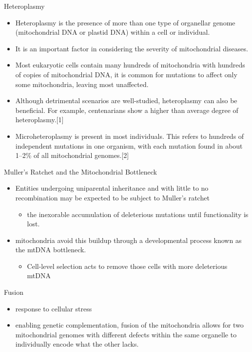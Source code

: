 \documentclass[presentation, smaller]{beamer}
\begin{document}
\begin{frame}[label={sec:org964335c}]{Heteroplasmy}
\begin{itemize}
\item Heteroplasmy is the presence of more than one type of organellar
genome (mitochondrial DNA or plastid DNA) within a cell or
individual.

\item It is an important factor in considering the severity of
mitochondrial diseases.

\item Most eukaryotic cells contain many hundreds of mitochondria with
hundreds of copies of mitochondrial DNA, it is common for mutations
to affect only some mitochondria, leaving most unaffected.

\item Although detrimental scenarios are well-studied, heteroplasmy can
also be beneficial. For example, centenarians show a higher than
average degree of heteroplasmy.[1]

\item Microheteroplasmy is present in most individuals. This refers to
hundreds of independent mutations in one organism, with each
mutation found in about 1–2\% of all mitochondrial genomes.[2]
\end{itemize}
\end{frame}

\begin{frame}[label={sec:org19cf295}]{Muller's Ratchet and the Mitochondrial Bottleneck}
\begin{itemize}
\item Entities undergoing uniparental inheritance and with little to no
recombination may be expected to be subject to Muller's ratchet
\begin{itemize}
\item the inexorable accumulation of deleterious mutations until functionality
is lost.
\end{itemize}
\item mitochondria avoid this buildup through a developmental process
known as the mtDNA bottleneck. 
\begin{itemize}
\item Cell-level selection acts to remove those cells with more deleterious mtDNA
\end{itemize}
\end{itemize}

\begin{block}{Fusion}
\begin{itemize}
\item response to cellular stress
\item enabling genetic complementation, fusion of the mitochondria allows
for two mitochondrial genomes with different defects within the same
organelle to individually encode what the other lacks.
\end{itemize}
\end{block}
\end{frame}
\end{document}
